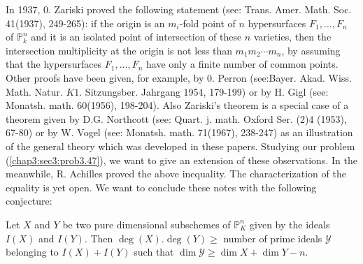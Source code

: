 \setcounter{remark}{47}
\begin{remark}\label{chap3:sec3:rem3.48}
  In 1937, 0. Zariski proved the following statement (see:
  Trans. Amer. Math. Soc. 41(1937), 249-265): if the origin is an
  $m_i$-fold point of $n$ hypersurfaces $F_1,\ldots,F_n$ of
  $\mathbb{P}_k^n$ and it is an isolated point of intersection of
  these $n$ varieties, then the intersection multiplicity at the
  origin is not less than $m_1m_2\cdots m_n$, by assuming that the
  hypersurfaces $F_1,\ldots,F_n$ have only a finite number of common
  points. Other proofs have been given, for example, by $0$. Perron
  (see:Bayer. Akad. Wiss. Math. Natur. $K1$. Sitzungsber. Jahrgang
  1954, 179-199) or by H. Gigl (see: Monatsh. math. 60(1956),
  198-204). Also Zariski's theorem is a special case of a theorem
  given by D.G. Northcott (see: Quart. j. math. Oxford Ser. (2)4
  (1953), 67-80) or by W. Vogel (see:
  Monatsh. math. 71(1967), 238-247) as an illustration of the general
  theory which was developed in these papers. Studying our problem
  (\ref{chap3:sec3:prob3.47}), we want to give an extension of these
  observations. In the 
  meanwhile, R. Achilles proved the above inequality. The
  characterization of the equality is yet open. We want to conclude
  these notes with the following conjecture:  
  \begin{conjecture}
    Let $X$ and $Y$ be two pure dimensional subschemes of
    $\mathbb{P}_K^{n}$ given by the ideals $I(X)$ and $I(Y)$. Then $\deg
    (X).\deg (Y) \geq $ number of prime ideals $\mathscr{Y}$ belonging
    to $I(X)+I(Y)$ such that $\dim \mathscr{Y} \geq \dim X + \dim
    Y-n$. 
  \end{conjecture}
\end{remark}

